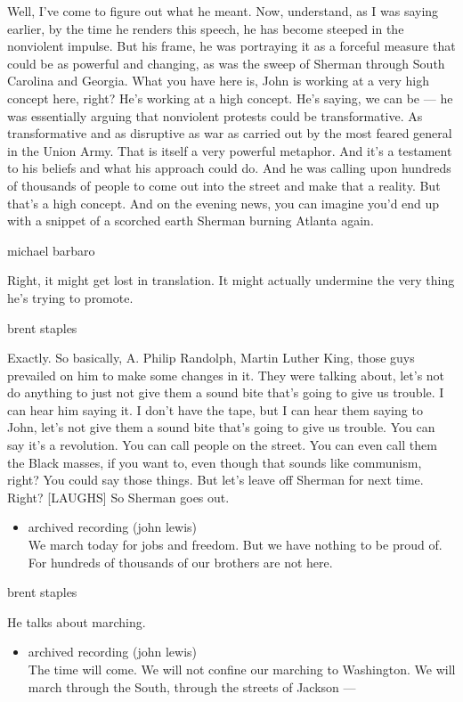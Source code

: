 Well, I've come to figure out what he meant. Now, understand, as I was
saying earlier, by the time he renders this speech, he has become
steeped in the nonviolent impulse. But his frame, he was portraying it
as a forceful measure that could be as powerful and changing, as was the
sweep of Sherman through South Carolina and Georgia. What you have here
is, John is working at a very high concept here, right? He's working at
a high concept. He's saying, we can be --- he was essentially arguing
that nonviolent protests could be transformative. As transformative and
as disruptive as war as carried out by the most feared general in the
Union Army. That is itself a very powerful metaphor. And it's a
testament to his beliefs and what his approach could do. And he was
calling upon hundreds of thousands of people to come out into the street
and make that a reality. But that's a high concept. And on the evening
news, you can imagine you'd end up with a snippet of a scorched earth
Sherman burning Atlanta again.

michael barbaro

Right, it might get lost in translation. It might actually undermine the
very thing he's trying to promote.

brent staples

Exactly. So basically, A. Philip Randolph, Martin Luther King, those
guys prevailed on him to make some changes in it. They were talking
about, let's not do anything to just not give them a sound bite that's
going to give us trouble. I can hear him saying it. I don't have the
tape, but I can hear them saying to John, let's not give them a sound
bite that's going to give us trouble. You can say it's a revolution. You
can call people on the street. You can even call them the Black masses,
if you want to, even though that sounds like communism, right? You could
say those things. But let's leave off Sherman for next time. Right?
{[}LAUGHS{]} So Sherman goes out.

\begin{itemize}
\tightlist
\item
  archived recording (john lewis)\\
  We march today for jobs and freedom. But we have nothing to be proud
  of. For hundreds of thousands of our brothers are not here.
\end{itemize}

brent staples

He talks about marching.

\begin{itemize}
\tightlist
\item
  archived recording (john lewis)\\
  The time will come. We will not confine our marching to Washington. We
  will march through the South, through the streets of Jackson ---
\end{itemize}

